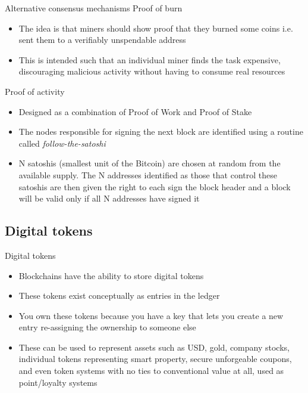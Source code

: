 \documentclass[10pt]{beamer}
\begin{document}
\begin{frame}{Alternative consensus mechanisms}
	Proof of burn
	\begin{itemize}
		\item The idea is that miners should show proof that they burned some coins i.e. sent them to a verifiably unspendable address
		\item This is intended such that an individual miner finds the task expensive, discouraging malicious activity without having to consume real resources
	\end{itemize}
	Proof of activity
	\begin{itemize}
		\item Designed as a combination of Proof of Work and Proof of Stake
		\item The nodes responsible for signing the next block are identified using a routine called \textit{follow-the-satoshi}
		\item N satoshis (smallest unit of the Bitcoin) are chosen at random from the available supply. The N addresses identified as those that control these satoshis are then given the right to each sign the block header and a block will be valid only if all N addresses have signed it
	\end{itemize}
\end{frame}


\subsection{Digital tokens}

\begin{frame}{Digital tokens}
	\begin{itemize}
		\item Blockchains have the ability to store digital tokens
		\item These tokens exist conceptually as entries in the ledger
		\item You own these tokens because you have a key that lets you create a new entry re-assigning the ownership to someone else
		\item These can be used to represent assets such as USD, gold, company stocks, individual tokens representing smart property, secure unforgeable coupons, and even token systems with no ties to conventional value at all, used as point/loyalty systems
	\end{itemize}
\end{frame}
\end{document}
